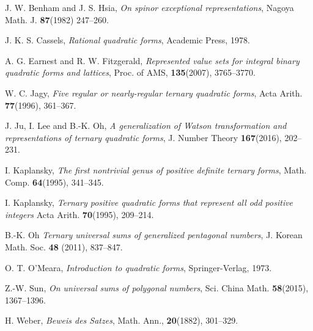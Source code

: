 \documentclass{amsart}
\theoremstyle{definition}
\theoremstyle{remark}
\numberwithin{equation}{section}
\begin{document}
\begin{thebibliography}{abcd}

 J. W. Benham and J. S. Hsia, {\em On spinor exceptional representations}, Nagoya Math. J. \textbf{87}(1982) 247--260.

 J. K. S. Cassels, {\em Rational quadratic forms}, Academic Press, 1978.

 A. G. Earnest and R. W. Fitzgerald, {\em Represented value sets for integral binary quadratic forms and lattices}, Proc. of AMS, \textbf{135}(2007), 3765--3770.

 W. C. Jagy,   {\em Five regular or nearly-regular ternary quadratic forms},  Acta Arith. \textbf{77}(1996),  361--367.

 J. Ju,  I. Lee and B.-K. Oh,  {\em A generalization of Watson transformation and representations of ternary quadratic forms},  J. Number Theory \textbf{167}(2016),  202--231. 

  I. Kaplansky,   {\em  The first nontrivial genus of positive definite ternary forms}, Math. Comp. \textbf{64}(1995),  341--345.

  I. Kaplansky,  {\em  Ternary positive quadratic forms that represent all odd positive integers} Acta Arith. \textbf{70}(1995),  209--214. 

 B.-K. Oh  {\em Ternary universal sums of generalized pentagonal numbers}, J. Korean Math. Soc. \textbf{48} (2011),  837--847.

 O. T. O'Meara, {\em Introduction to quadratic forms}, Springer-Verlag, 1973.

  Z.-W. Sun, {\em On universal sums of polygonal numbers}, Sci. China Math. \textbf{58}(2015),
1367--1396.

 H. Weber,  {\em Beweis des Satzes},  Math. Ann., \textbf{20}(1882), 301--329.

\end{thebibliography}
\end{document}

